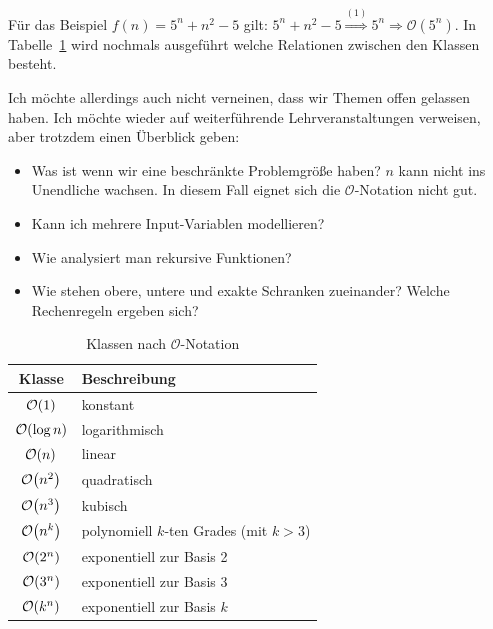 Für das Beispiel $f(n) = 5^n + n^2 - 5$ gilt: $5^n + n^2 - 5 \stackrel{(1)}{\Rightarrow} 5^n  \Rightarrow \mathcal{O}(5^n)$. In Tabelle~\ref{tab:classes} wird nochmals ausgeführt welche Relationen zwischen den Klassen besteht.

Ich möchte allerdings auch nicht verneinen, dass wir Themen offen gelassen haben. Ich möchte wieder auf weiterführende Lehrveranstaltungen verweisen, aber trotzdem einen Überblick geben:
\begin{itemize}
  \item Was ist wenn wir eine beschränkte Problemgröße haben? $n$ kann nicht ins Unendliche wachsen. In diesem Fall eignet sich die $\mathcal{O}$-Notation nicht gut.
  \item Kann ich mehrere Input-Variablen modellieren?
  \item Wie analysiert man rekursive Funktionen?
  \item Wie stehen obere, untere und exakte Schranken zueinander? Welche Rechenregeln ergeben sich?
\end{itemize}
%
\begin{table}[ht]
 \begin{center}
  \begin{tabular}{cl}
   Klasse & Beschreibung \\
  \hline
   $\mathcal{O}\!\left(1\right)$ & konstant \\
   $\mathcal{O}\!\left(\log{n}\right)$ & logarithmisch \\
   $\mathcal{O}\!\left(n\right)$ & linear \\
   $\mathcal{O}\!\left(n^2\right)$ & quadratisch \\
   $\mathcal{O}\!\left(n^3\right)$ & kubisch \\
   $\mathcal{O}\!\left(n^k\right)$ & polynomiell $k$-ten Grades (mit $k>3$) \\
   $\mathcal{O}\!\left(2^n\right)$ & exponentiell zur Basis 2 \\
   $\mathcal{O}\!\left(3^n\right)$ & exponentiell zur Basis 3 \\
   $\mathcal{O}\!\left(k^n\right)$ & exponentiell zur Basis $k$ \\
  \end{tabular}
  \caption{Klassen nach $\mathcal{O}$-Notation}
  \label{tab:classes}
 \end{center}
\end{table}

